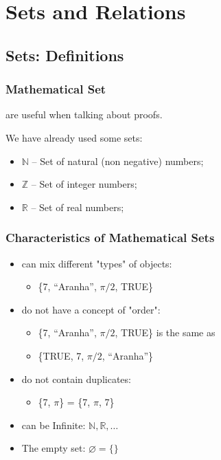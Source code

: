 \section{Sets and Relations}


\subsection{Sets: Definitions}
\begin{frame}
  \frametitle{Mathematical Set}

   are useful when talking about proofs.\bigskip
  
  We have already used some sets: \bigskip

  \begin{itemize}
    \item $\mathbb{N}$ -- Set of natural (non negative) numbers;
    \item $\mathbb{Z}$ -- Set of integer numbers;
    \item $\mathbb{R}$ -- Set of real numbers;
  \end{itemize}
\end{frame}

\begin{frame}
  \frametitle{Characteristics of Mathematical Sets}

  \begin{itemize}
    \item  {} can mix different "types" of objects:
    \begin{itemize}
    \item \{7, ``Aranha'', $\pi/2$, TRUE\}
    \end{itemize}\medskip

    \item {} do not have a concept of "order":
    \begin{itemize}
      \item \{7, ``Aranha'', $\pi/2$, TRUE\} is the same as \item \{TRUE, 7, $\pi/2$, ``Aranha''\}
    \end{itemize}\medskip

    \item {} do not contain duplicates:
    \begin{itemize}
    \item \{7, $\pi$\} = \{7, $\pi$, 7\}
    \end{itemize}\medskip

    \item {} can be Infinite: $\mathbb{N}, \mathbb{R}, \ldots$\medskip
    
    \item The empty set: $\varnothing = \{\}$
  \end{itemize}
\end{frame}


